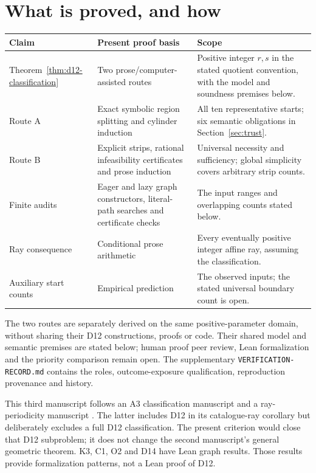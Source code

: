 \documentclass[11pt]{amsart}
\newcommand{\record}[1]{\nolinkurl{#1}}
\theoremstyle{definition}\newtheorem{definition}[theorem]{Definition}
\begin{document}
\section{What is proved, and how}\label{sec:guarantees}
\begin{center}\small
\begin{tabular}{p{}p{}p{}}
\toprule Claim & Present proof basis & Scope\\\midrule
Theorem~\ref{thm:d12-classification} & Two prose/computer-assisted routes & Positive integer $r,s$ in the stated quotient convention, with the model and soundness premises below.\\
Route A & Exact symbolic region splitting and cylinder induction & All ten representative starts; six semantic obligations in Section~\ref{sec:trust}.\\
Route B & Explicit strips, rational infeasibility certificates and prose induction & Universal necessity and sufficiency; global simplicity covers arbitrary strip counts.\\
Finite audits & Eager and lazy graph constructors, literal-path searches and certificate checks & The input ranges and overlapping counts stated below.\\
Ray consequence & Conditional prose arithmetic & Every eventually positive integer affine ray, assuming the classification.\\
Auxiliary start counts & Empirical prediction & The observed inputs; the stated universal boundary count is open.\\
\bottomrule
\end{tabular}
\end{center}
The two routes are separately derived on the same positive-parameter
domain, without sharing their D12 constructions, proofs or code.
Their shared model and semantic premises are stated below; human proof
peer review, Lean formalization and the priority comparison remain open.
The supplementary \record{VERIFICATION-RECORD.md} contains the roles,
outcome-exposure qualification, reproduction provenance and history.

This third manuscript follows an A3 classification manuscript and a
ray-periodicity manuscript \cite{A3,Lines}. The latter includes D12 in
its catalogue-ray corollary but deliberately excludes a full D12
classification. The present criterion would close that D12 subproblem;
it does not change the second manuscript's general geometric theorem.
K3, C1, O2 and D14 have Lean graph results. Those
results provide formalization patterns, not a Lean proof of D12.
\end{document}
